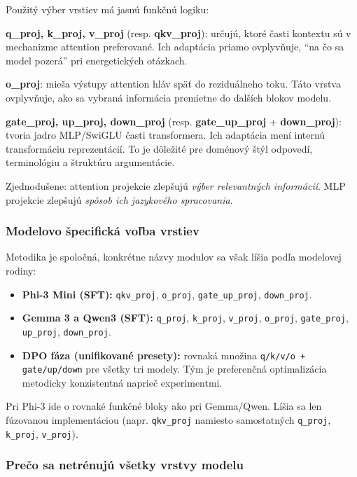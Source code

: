 Použitý výber vrstiev má jasnú funkčnú logiku:\par\medskip
\noindent\textbf{q\_proj, k\_proj, v\_proj} (resp. \textbf{qkv\_proj}): určujú, ktoré časti kontextu sú v mechanizme attention preferované. Ich adaptácia priamo ovplyvňuje, \enquote{na čo sa model pozerá} pri energetických otázkach.\par\medskip
\noindent\textbf{o\_proj}: mieša výstupy attention hláv späť do reziduálneho toku. Táto vrstva ovplyvňuje, ako sa vybraná informácia premietne do ďalších blokov modelu.\par\medskip
\noindent\textbf{gate\_proj, up\_proj, down\_proj} (resp. \textbf{gate\_up\_proj} + \textbf{down\_proj}): tvoria jadro MLP/SwiGLU časti transformera. Ich adaptácia mení internú transformáciu reprezentácií. To je dôležité pre doménový štýl odpovedí, terminológiu a štruktúru argumentácie.\par\medskip

Zjednodušene: attention projekcie zlepšujú \textit{výber relevantných informácií}. MLP projekcie zlepšujú \textit{spôsob ich jazykového spracovania}.

\subsubsection{Modelovo špecifická voľba vrstiev}

Metodika je spoločná, konkrétne názvy modulov sa však líšia podľa modelovej rodiny:
\begin{itemize}
    \item \textbf{Phi-3 Mini (SFT):} \texttt{qkv\_proj}, \texttt{o\_proj}, \texttt{gate\_up\_proj}, \texttt{down\_proj}.
    \item \textbf{Gemma 3 a Qwen3 (SFT):} \texttt{q\_proj}, \texttt{k\_proj}, \texttt{v\_proj}, \texttt{o\_proj}, \texttt{gate\_proj}, \texttt{up\_proj}, \texttt{down\_proj}.
    \item \textbf{DPO fáza (unifikované presety):} rovnaká množina \texttt{q/k/v/o + gate/up/down} pre všetky tri modely. Tým je preferenčná optimalizácia metodicky konzistentná naprieč experimentmi.
\end{itemize}

Pri Phi-3 ide o rovnaké funkčné bloky ako pri Gemma/Qwen. Líšia sa len fúzovanou implementáciou (napr. \texttt{qkv\_proj} namiesto samostatných \texttt{q\_proj}, \texttt{k\_proj}, \texttt{v\_proj}).

\subsubsection{Prečo sa netrénujú všetky vrstvy modelu}

